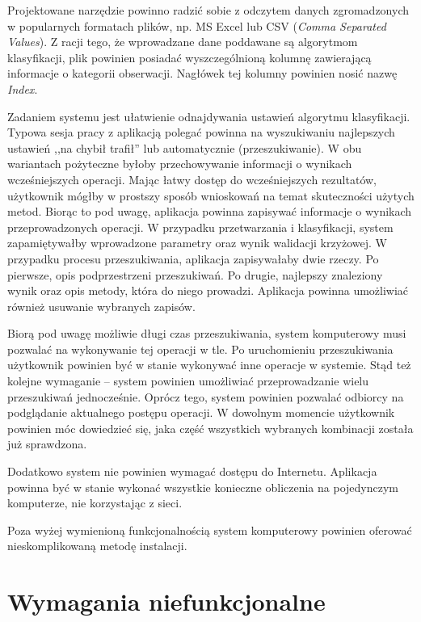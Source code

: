\documentclass[../thesis.tex]{subfiles}
\begin{document}
Projektowane narzędzie powinno radzić sobie z odczytem danych zgromadzonych w popularnych formatach plików, np. MS Excel lub CSV (\textit{Comma Separated Values}). Z racji tego, że wprowadzane dane poddawane są algorytmom klasyfikacji, plik powinien posiadać wyszczególnioną kolumnę zawierającą informacje o kategorii obserwacji. Nagłówek tej kolumny powinien nosić nazwę \textit{Index}.

Zadaniem systemu jest ułatwienie odnajdywania ustawień algorytmu klasyfikacji. Typowa sesja pracy z aplikacją polegać powinna na wyszukiwaniu najlepszych ustawień ,,na chybił trafił'' lub automatycznie (przeszukiwanie). W obu wariantach pożyteczne byłoby przechowywanie informacji o wynikach wcześniejszych operacji. Mając łatwy dostęp do wcześniejszych rezultatów, użytkownik mógłby w prostszy sposób wnioskowań na temat skuteczności użytych metod. Biorąc to pod uwagę, aplikacja powinna zapisywać informacje o wynikach przeprowadzonych operacji. W przypadku przetwarzania i klasyfikacji, system zapamiętywałby wprowadzone parametry oraz wynik walidacji krzyżowej. W przypadku procesu przeszukiwania, aplikacja zapisywałaby dwie rzeczy. Po pierwsze, opis podprzestrzeni przeszukiwań. Po drugie, najlepszy znaleziony wynik oraz opis metody, która do niego prowadzi. Aplikacja powinna umożliwiać również usuwanie wybranych zapisów.

Biorą pod uwagę możliwie długi czas przeszukiwania, system komputerowy musi pozwalać na wykonywanie tej operacji w tle. Po uruchomieniu przeszukiwania użytkownik powinien być w stanie wykonywać inne operacje w systemie. Stąd też kolejne wymaganie -- system powinien umożliwiać przeprowadzanie wielu przeszukiwań jednocześnie. Oprócz tego, system powinien pozwalać odbiorcy na podglądanie aktualnego postępu operacji. W dowolnym momencie użytkownik powinien móc dowiedzieć się, jaka część wszystkich wybranych kombinacji została już sprawdzona.

Dodatkowo system nie powinien wymagać dostępu do Internetu. Aplikacja powinna być w stanie wykonać wszystkie konieczne obliczenia na pojedynczym komputerze, nie korzystając z sieci.

Poza wyżej wymienioną funkcjonalnością system komputerowy powinien oferować nieskomplikowaną metodę instalacji. 

\section{Wymagania niefunkcjonalne}
\end{document}
